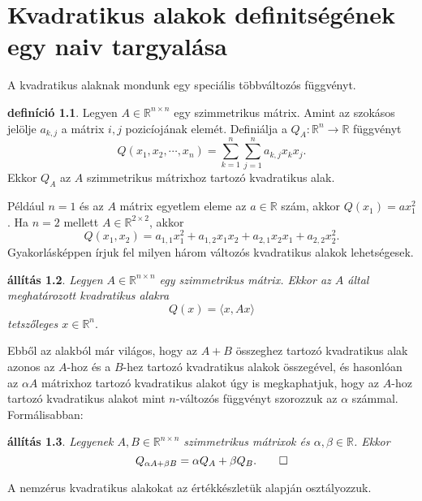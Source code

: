 \documentclass[a4paper, showtrims]{memoir}
\theoremstyle{plain}
\newtheorem{proposition}{állítás}[chapter]
\theoremstyle{remark}
\theoremstyle{definition}
\newtheorem{definition}[proposition]{definíció}
\newcommand{\ip}[2]{\langle#1,#2\rangle}
\begin{document}
\chapter{Kvadratikus alakok definitségének egy naiv targyalása}
A kvadratikus alaknak mondunk egy speciális többváltozós függvényt.
\begin{definition}
    Legyen $A\in\mathbb{R}^{n\times n}$ egy szimmetrikus mátrix.
    Amint az szokásos jelölje $a_{k,j}$ a mátrix $i,j$ pozicíojának elemét.
    Definiálja a $Q_A:\mathbb{R}^n\to\mathbb{R}$ függvényt
    \[
    Q\left( x_{1},x_2,\cdots,x_n \right)=
    \sum_{k=1}^n\sum_{j=1}^na_{k,j}x_kx_j.
    \]
    Ekkor $Q_A$ az $A$ szimmetrikus mátrixhoz tartozó kvadratikus alak.
\end{definition}
Például $n=1$ és az $A$ mátrix egyetlem eleme az $a\in\mathbb{R}$ szám, akkor $Q(x_1)=ax_1^2$.
Ha $n=2$ mellett $A\in\mathbb{R}^{2\times 2}$, akkor
$$
Q\left( x_1,x_2 \right)=a_{1,1}x_1^2+a_{1,2}x_1x_2+a_{2,1}x_2x_1+a_{2,2}x_2^2.
$$
Gyakorlásképpen írjuk fel milyen három változós kvadratikus alakok lehetségesek.
\begin{proposition}
    Legyen $A\in\mathbb{R}^{n\times n}$ egy szimmetrikus mátrix.
    Ekkor az $A$ által meghatározott kvadratikus alakra
    \[
        Q(x)=\ip{x}{Ax}
    \]
    tetszőleges $x\in\mathbb{R}^n.$
\end{proposition}
Ebből az alakból már világos, hogy az $A+B$ összeghez tartozó kvadratikus alak azonos az $A$-hoz és a $B$-hez
tartozó kvadratikus alakok összegével, 
és hasonlóan az $\alpha A$ mátrixhoz tartozó kvadratikus alakot úgy is megkaphatjuk, hogy az $A$-hoz tartozó kvadratikus alakot mint $n$-változós függvényt szorozzuk az $\alpha$ számmal.
Formálisabban:
\begin{proposition}
    Legyenek $A,B\in\mathbb{R}^{n\times n}$ szimmetrikus mátrixok és $\alpha,\beta\in\mathbb{R}$.
    Ekkor
    \[
    Q_{\alpha A+\beta B}=\alpha Q_A+\beta Q_B.
    \qedhere
    \]
\end{proposition}
A nemzérus kvadratikus alakokat az értékkészletük alapján osztályozzuk.
\end{document}
